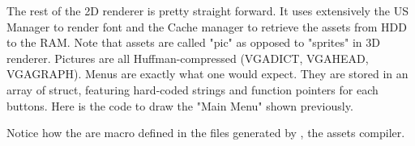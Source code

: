 \par
The rest of the 2D renderer is pretty straight forward. It uses extensively the US Manager to render font and the Cache manager to retrieve the assets from HDD to the RAM. Note that assets are called "pic" as opposed to "sprites" in 3D renderer. Pictures are all Huffman-compressed (VGADICT, VGAHEAD, VGAGRAPH). Menus are exactly what one would expect. They are stored in an array of struct, featuring hard-coded strings and function pointers for each buttons. Here is the code to draw the "Main Menu" shown previously.\\

\par
\begin{minipage}{\textwidth}

\end{minipage}

\par
\begin{minipage}{\textwidth}

\end{minipage}
\par
Notice how the  are macro defined in the files generated by , the assets compiler.

